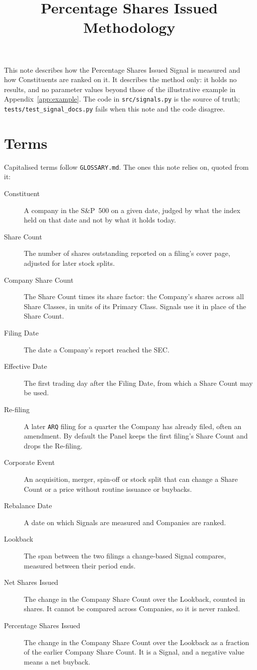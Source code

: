 \documentclass[11pt]{article}
\title{Percentage Shares Issued\\\large Methodology}
\date{}
\newcommand{\glossaryterm}[2]{\item[#1] #2}
\begin{document}
\maketitle

\noindent This note describes how the Percentage Shares Issued Signal is measured and how
Constituents are ranked on it. It describes the method only: it holds no results, and no
parameter values beyond those of the illustrative example in Appendix~\ref{app:example}.
The code in \texttt{src/signals.py} is the source of truth;
\texttt{tests/test\_signal\_docs.py} fails when this note and the code disagree.

\section{Terms}

Capitalised terms follow \texttt{GLOSSARY.md}. The ones this note relies on, quoted from it:

\begin{description}
  \glossaryterm{Constituent}{A company in the S\&P~500 on a given date, judged by what the index held on that date and not by what it holds today.}
  \glossaryterm{Share Count}{The number of shares outstanding reported on a filing's cover page, adjusted for later stock splits.}
  \glossaryterm{Company Share Count}{The Share Count times its share factor: the Company's shares across all Share Classes, in units of its Primary Class. Signals use it in place of the Share Count.}
  \glossaryterm{Filing Date}{The date a Company's report reached the SEC.}
  \glossaryterm{Effective Date}{The first trading day after the Filing Date, from which a Share Count may be used.}
  \glossaryterm{Re-filing}{A later \texttt{ARQ} filing for a quarter the Company has already filed, often an amendment. By default the Panel keeps the first filing's Share Count and drops the Re-filing.}
  \glossaryterm{Corporate Event}{An acquisition, merger, spin-off or stock split that can change a Share Count or a price without routine issuance or buybacks.}
  \glossaryterm{Rebalance Date}{A date on which Signals are measured and Companies are ranked.}
  \glossaryterm{Lookback}{The span between the two filings a change-based Signal compares, measured between their period ends.}
  \glossaryterm{Net Shares Issued}{The change in the Company Share Count over the Lookback, counted in shares. It cannot be compared across Companies, so it is never ranked.}
  \glossaryterm{Percentage Shares Issued}{The change in the Company Share Count over the Lookback as a fraction of the earlier Company Share Count. It is a Signal, and a negative value means a net buyback.}
\end{description}
\end{document}

